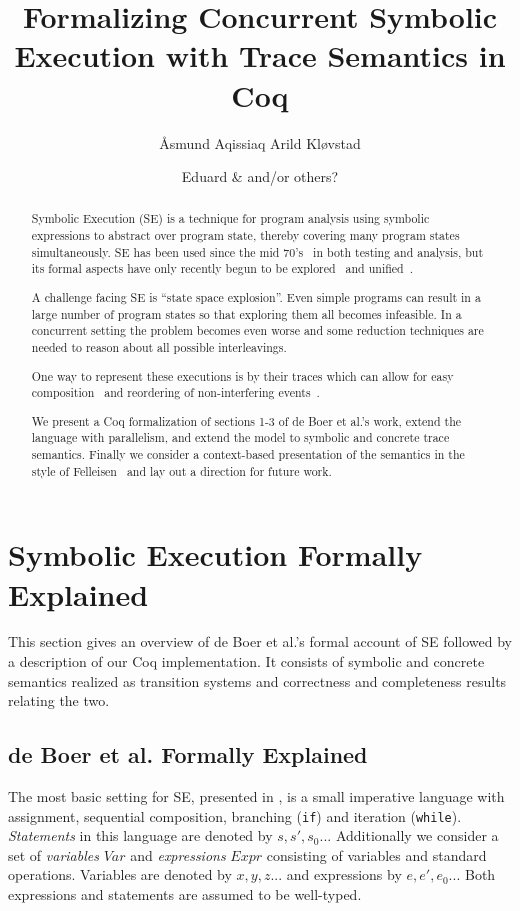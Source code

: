 \documentclass[submission,copyright,creativecommons]{eptcs}
\title{Formalizing Concurrent Symbolic Execution with Trace Semantics in Coq}
\author{Åsmund Aqissiaq Arild Kløvstad
\institute{UiO\\ Oslo, Norway}
\institute{Department of Informatics}
\email{aaklovst@ifi.uio.no}
\and
Eduard \& and/or others?
\institute{UiO\\ Oslo, Norway}
\institute{Institute of Informatics}
}
\begin{document}
\maketitle

\begin{abstract}
  Symbolic Execution (SE) is a technique for program analysis using symbolic expressions to abstract over program state,
  thereby covering many program states simultaneously. SE has been used since the mid 70's~\cite{king1976symbolic,boyer1975select}
  in both testing and analysis, but its formal aspects have only recently begun to be explored~\cite{boer2021}
  and unified~\cite{Steinhoefel2022}.

  A challenge facing SE is ``state space explosion''. Even simple programs can result in a
  large number of program states so that exploring them all becomes infeasible.
  In a concurrent setting the problem becomes even worse and some reduction techniques are needed to reason
  about all possible interleavings.

  One way to represent these executions is by their traces which can allow for easy composition~\cite{din2022lagc}
  and reordering of non-interfering events~\cite{Mazurkiewicz1977}.

  We present a Coq formalization of sections 1-3 of de Boer et al.'s work, extend the language with parallelism, and
  extend the model to symbolic and concrete trace semantics. Finally we consider a context-based presentation of the semantics
  in the style of Felleisen~\cite{FELLEISEN1992235} and lay out a direction for future work.
\end{abstract}

\section{Symbolic Execution Formally Explained}
This section gives an overview of de Boer et al.'s formal account of SE
followed by a description of our Coq implementation. It consists of symbolic and concrete semantics
realized as transition systems and correctness and completeness results relating the two.

\subsection{de Boer et al. Formally Explained}
The most basic setting for SE, presented in \cite[sec. 2]{boer2021},
is a small imperative language with assignment, sequential composition, branching (\texttt{if})
and iteration (\texttt{while}). \emph{Statements} in this language are denoted by $s, s', s_{0}...$
Additionally we consider a set of \emph{variables} $Var$ and \emph{expressions} $Expr$ consisting of variables and
standard operations. Variables are denoted by $x,y,z...$ and expressions by $e, e', e_{0}...$
Both expressions and statements are assumed to be well-typed.
\end{document}
